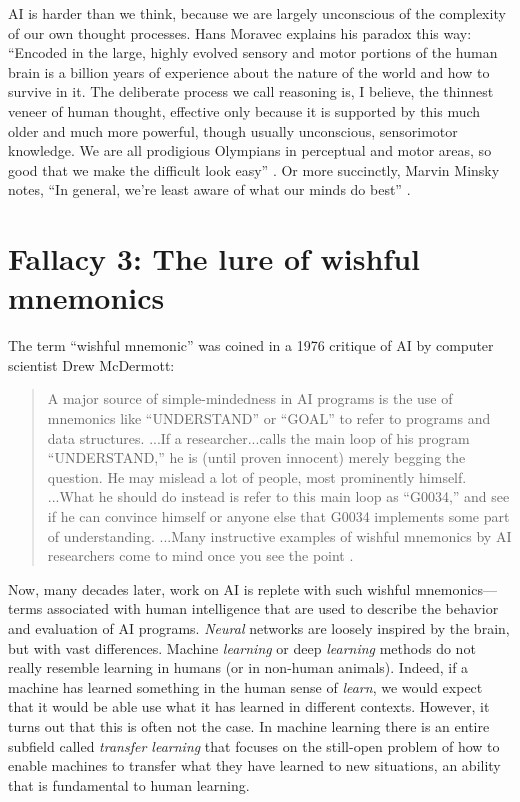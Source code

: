 \documentclass[12pt]{article}
\begin{document}
AI is harder than we think, because we are largely unconscious of the complexity of our own thought processes. Hans Moravec explains his paradox this way: ``Encoded in the large, highly evolved sensory and motor portions of the human brain is a billion years of experience about the nature of the world and how to survive in it. The deliberate process we call reasoning is, I believe, the thinnest veneer of human thought, effective only because it is supported by this much older and much more powerful, though usually unconscious, sensorimotor knowledge. We are all prodigious Olympians in perceptual and motor areas, so good that we make the difficult look easy'' \cite{Moravec1988b}. Or more succinctly, Marvin Minsky notes, ``In general, we're least aware of what our minds do best'' \cite{Minsky1980}. 

\section*{Fallacy 3: The lure of wishful mnemonics}
The term ``wishful mnemonic'' was coined in a 1976 critique of AI by computer scientist Drew McDermott:

\begin{quote}
     A major source of simple-mindedness in AI programs is the use of mnemonics like ``UNDERSTAND'' or ``GOAL'' to refer to programs and data structures. ...If a researcher...calls the main loop of his program ``UNDERSTAND,'' he is (until proven innocent) merely begging the question. He may mislead a lot of people, most prominently himself. ...What he should do instead is refer to this main loop as ``G0034,'' and see if he can convince himself or anyone else that G0034 implements some part of understanding. ...Many instructive examples of wishful mnemonics by AI researchers come to mind once you see the point \cite{McDermott1976}.
\end{quote}

Now, many decades later, work on AI is replete with such wishful mnemonics---terms associated with human intelligence that are used to describe the behavior and evaluation of AI programs.  \textit{Neural} networks are loosely inspired by the brain, but with vast differences.  Machine \textit{learning} or deep \textit{learning} methods do not really resemble learning in humans (or in non-human animals).  Indeed, if a machine has learned something in the human sense of \textit{learn}, we would expect that it would be able use what it has learned in different contexts.  However, it turns out that this is often not the case.  In machine learning there is an entire subfield called \textit{transfer learning} that focuses on the still-open problem of how to enable machines to transfer what they have learned to new situations, an ability that is fundamental to human learning.
\end{document}

